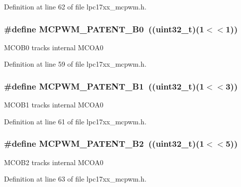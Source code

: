 \-Definition at line 62 of file lpc17xx\-\_\-mcpwm.\-h.

\hypertarget{group___m_c_p_w_m___public___macros_ga7cba2e4bb6e650b8df3c46b8bf98b538}{
\subsubsection[{\-M\-C\-P\-W\-M\-\_\-\-P\-A\-T\-E\-N\-T\-\_\-\-B0}]{\setlength{\rightskip}{0pt plus 5cm}\#define {\bf \-M\-C\-P\-W\-M\-\_\-\-P\-A\-T\-E\-N\-T\-\_\-\-B0}~((uint32\-\_\-t)(1$<$$<$1))}}\label{group___m_c_p_w_m___public___macros_ga7cba2e4bb6e650b8df3c46b8bf98b538}
\-M\-C\-O\-B0 tracks internal \-M\-C\-O\-A0 

\-Definition at line 59 of file lpc17xx\-\_\-mcpwm.\-h.

\hypertarget{group___m_c_p_w_m___public___macros_ga6817389a404f96c227f61cd249e3659d}{
\subsubsection[{\-M\-C\-P\-W\-M\-\_\-\-P\-A\-T\-E\-N\-T\-\_\-\-B1}]{\setlength{\rightskip}{0pt plus 5cm}\#define {\bf \-M\-C\-P\-W\-M\-\_\-\-P\-A\-T\-E\-N\-T\-\_\-\-B1}~((uint32\-\_\-t)(1$<$$<$3))}}\label{group___m_c_p_w_m___public___macros_ga6817389a404f96c227f61cd249e3659d}
\-M\-C\-O\-B1 tracks internal \-M\-C\-O\-A0 

\-Definition at line 61 of file lpc17xx\-\_\-mcpwm.\-h.

\hypertarget{group___m_c_p_w_m___public___macros_ga92903e4298d97cf72acd65bbcd66b16c}{
\subsubsection[{\-M\-C\-P\-W\-M\-\_\-\-P\-A\-T\-E\-N\-T\-\_\-\-B2}]{\setlength{\rightskip}{0pt plus 5cm}\#define {\bf \-M\-C\-P\-W\-M\-\_\-\-P\-A\-T\-E\-N\-T\-\_\-\-B2}~((uint32\-\_\-t)(1$<$$<$5))}}\label{group___m_c_p_w_m___public___macros_ga92903e4298d97cf72acd65bbcd66b16c}
\-M\-C\-O\-B2 tracks internal \-M\-C\-O\-A0 

\-Definition at line 63 of file lpc17xx\-\_\-mcpwm.\-h.

